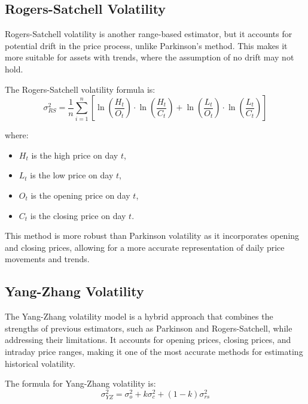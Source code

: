 \documentclass[letterpaper,11pt]{article}
\begin{document}
\subsection{Rogers-Satchell Volatility}
Rogers-Satchell volatility is another range-based estimator, but it accounts for potential drift in the price process, unlike Parkinson's method. This makes it more suitable for assets with trends, where the assumption of no drift may not hold.

The Rogers-Satchell volatility formula is:
\[
\sigma_{RS}^2 = \frac{1}{n} \sum_{i=1}^n \left[ \ln\left(\frac{H_t}{O_t}\right) \cdot \ln\left(\frac{H_t}{C_t}\right) + \ln\left(\frac{L_t}{O_t}\right) \cdot \ln\left(\frac{L_t}{C_t}\right) \right]
\]


where:
\begin{itemize}
    \item \( H_t \) is the high price on day \( t \),
    \item \( L_t \) is the low price on day \( t \),
    \item \( O_t \) is the opening price on day \( t \),
    \item \( C_t \) is the closing price on day \( t \).
\end{itemize}

This method is more robust than Parkinson volatility as it incorporates opening and closing prices, allowing for a more accurate representation of daily price movements and trends.



\subsection{Yang-Zhang Volatility}
The Yang-Zhang volatility model is a hybrid approach that combines the strengths of previous estimators, such as Parkinson and Rogers-Satchell, while addressing their limitations. It accounts for opening prices, closing prices, and intraday price ranges, making it one of the most accurate methods for estimating historical volatility.

The formula for Yang-Zhang volatility is:
\[
\sigma_{YZ}^2 = \sigma_o^2 + k \sigma_c^2 + (1 - k) \sigma_{rs}^2
\]
\end{document}
